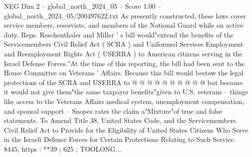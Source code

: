 \begin{textsample}{NEG Dim 2 – global\_north\_2024\_05 – Score 1.00 – global\_north\_2024\_05/200497622.txt}
As presently constructed, these laws cover service members, reservists, and members of the National Guard while on active duty.
Reps.
Reschenthaler and Miller ' s bill would"extend the benefits of the Servicemembers Civil Relief Act ( SCRA ) and Uniformed Services Employment and Reemployment Rights Act ( USERRA ) to American citizens serving in the Israel Defense Forces."At the time of this reporting, the bill had been sent to the House Committee on Veterans ' Affairs.
Because this bill would bestow the legal protections of the SCRA and USERRA to @ @ @ @ @ @ @ @ @ @ but because it would not give them"the same taxpayer benefits"given to U.S. veterans -- things like access to the Veterans Affairs medical system, unemployment compensation, and spousal support -- Snopes rates the claim a"Mixture"of true and false statements.
To Amend Title 38, United States Code, and the Servicemembers Civil Relief Act to Provide for the Eligibility of United States Citizens Who Serve in the Israeli Defense Forces for Certain Protections Relating to Such Service. 8445, https : **39 ; 625 ; TOOLONG...

\end{textsample}
